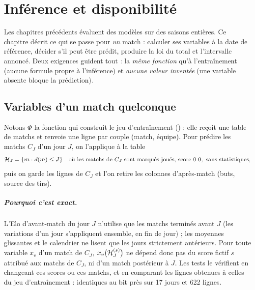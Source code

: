 
\chapter{Inférence et disponibilité}
\label{chap:inference}

Les chapitres précédents évaluent des modèles sur des saisons entières. Ce chapitre décrit ce qui se
passe pour \emph{un} match : calculer ses variables à la date de référence, décider s'il peut être
prédit, produire la loi du total et l'intervalle annoncé. Deux exigences guident tout : la
\emph{même fonction} qu'à l'entraînement (aucune formule propre à l'inférence) et \emph{aucune valeur
inventée} (une variable absente bloque la prédiction).

\section{Variables d'un match quelconque}
\label{sec:inference-variables}

Notons \(\Phi\) la fonction qui construit le jeu d'entraînement () :
elle reçoit une table de matchs et renvoie une ligne par couple (match, équipe). Pour prédire les
matchs \(C_J\) d'un jour \(J\), on l'applique à la table
\[
  \mathcal{H}_J = \{ m : d(m) \le J \}
  \quad \text{où les matchs de } C_J \text{ sont marqués joués, score } 0\text{-}0, \text{ sans statistiques,}
\]
puis on garde les lignes de \(C_J\) et l'on retire les colonnes d'après-match (buts, source des tirs).

\paragraph{Pourquoi c'est exact.} L'Elo d'avant-match du jour \(J\) n'utilise que les matchs terminés
avant \(J\) (les variations d'un jour s'appliquent ensemble, en fin de jour) ; les moyennes glissantes
et le calendrier ne lisent que les jours strictement antérieurs. Pour toute variable \(x_v\) d'un
match de \(C_J\), \(x_v\big(\mathcal{H}_J^{(s)}\big)\) ne dépend donc pas du score fictif \(s\) attribué aux
matchs de \(C_J\), ni d'un match postérieur à \(J\). Les tests le vérifient en changeant ces scores ou
ces matchs, et en comparant les lignes obtenues à celles du jeu d'entraînement : identiques au bit
près sur 17 jours et 622 lignes.

